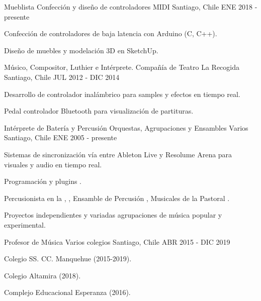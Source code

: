 \begin{cventries}
  \cventry
    {Mueblista} %
    {Confección y diseño de controladores MIDI} %
    {Santiago, Chile} %
    {ENE 2018 - presente} %
    {
      \begin{cvitems} %
        \item {Confección de controladores  de baja latencia con Arduino (C, C++).}
        \item {Diseño de muebles y modelación 3D en SketchUp.}
      \end{cvitems}
    }

  \cventry
    {Músico, Compositor, Luthier e Intérprete.}
    {Compañía de Teatro La Recogida}
    {Santiago, Chile}
    {JUL 2012 - DIC 2014}
    {
      \begin{cvitems} %
        \item {Desarrollo de controlador  inalámbrico para samples y efectos en tiempo real.}
        \item {Pedal controlador Bluetooth para visualización de partituras.}
      \end{cvitems}
    }

  \cventry
    {Intérprete de Batería y Percusión}
    {Orquestas, Agrupaciones y Ensambles Varios}
    {Santiago, Chile}
    {ENE 2005 - presente}
    {
    	\begin{cvitems} %
    	  \item {Sistemas de sincronización  vía  entre Ableton Live y Resolume Arena para visuales y audio  en tiempo real.}
    	  \item {Programación  y plugins .}
        \item {Percusionista en la , , Ensamble de Percusión , Musicales de la Pastoral .}
        \item {Proyectos independientes y variadas agrupaciones de música popular y experimental.}
      \end{cvitems}
		}

  \cventry
    {Profesor de Música} %
    {Varios colegios} %
    {Santiago, Chile} %
    {ABR 2015 - DIC 2019} %
    {
      \begin{cvitems} %
        \item {Colegio SS. CC. Manquehue (2015-2019).}
        \item {Colegio Altamira (2018).}
        \item {Complejo Educacional Esperanza (2016).}
      \end{cvitems}
    }

\end{cventries}

